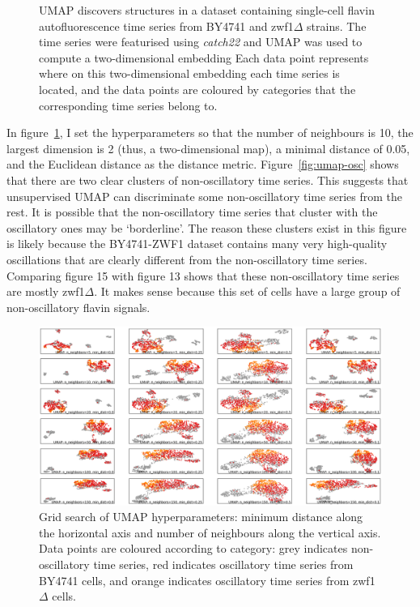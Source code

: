 \begin{figure}
  \caption{
    UMAP discovers structures in a dataset containing single-cell flavin autofluorescence time series from BY4741 and zwf1$\Delta$ strains.
    The time series were featurised using \textit{catch22} and UMAP was used to compute a two-dimensional embedding
    Each data point represents where on this two-dimensional embedding each time series is located, and the data points are coloured by categories that the corresponding time series belong to.
  }
  \label{fig:umap}
\end{figure}

In figure~\ref{fig:umap}, I set the hyperparameters so that the number of neighbours is 10, the largest dimension is 2 (thus, a two-dimensional map), a minimal distance of 0.05, and the Euclidean distance as the distance metric.
Figure~\ref{fig:umap-osc} shows that there are two clear clusters of non-oscillatory time series.
This suggests that unsupervised UMAP can discriminate some non-oscillatory time series from the rest.
It is possible that the non-oscillatory time series that cluster with the oscillatory ones may be `borderline'.
The reason these clusters exist in this figure is likely because the BY4741-ZWF1 dataset contains many very high-quality oscillations that are clearly different from the non-oscillatory time series.
Comparing figure 15 with figure 13 shows that these non-oscillatory time series are mostly zwf1$\Delta$.
It makes sense because this set of cells have a large group of non-oscillatory flavin signals.

\begin{figure}
  \centering
    \includegraphics[width=0.9\linewidth]{IdenFeatures_20016_UMAP_22_cropped}
    \caption{
      Grid search of UMAP hyperparameters: minimum distance along the horizontal axis and number of neighbours along the vertical axis.
      Data points are coloured according to category: grey indicates non-oscillatory time series, red indicates oscillatory time series from BY4741 cells, and orange indicates oscillatory time series from zwf1$\Delta$ cells.
    }
  \label{fig:umap-gridsearch}
\end{figure}

